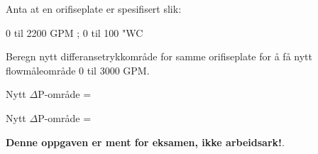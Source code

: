 

Anta at en orifiseplate er spesifisert slik:

\vskip 10pt

\hskip 40pt 0 til 2200 GPM ; 0 til 100 "WC

\vskip 10pt

Beregn nytt differansetrykkområde for samme orifiseplate for å få nytt flowmåleområde 0 til 3000 GPM.

\vskip 10pt

Nytt $\Delta$P-område = \underbar{\hskip 50pt}







Nytt $\Delta$P-område = 







{\bf Denne oppgaven er ment for eksamen, ikke arbeidsark!}.

